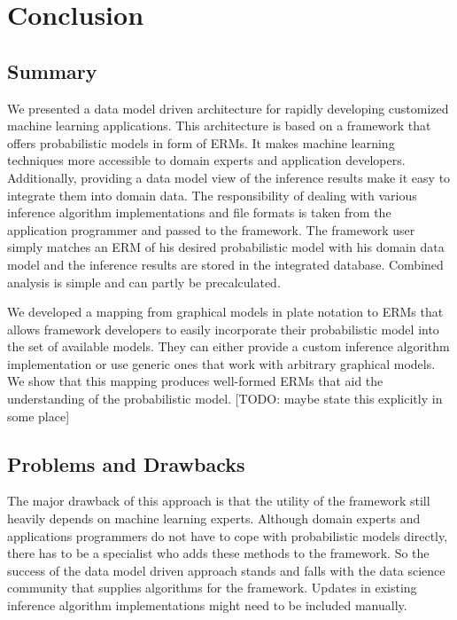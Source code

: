 \section{Conclusion}

\subsection{Summary}

We presented a data model driven architecture for rapidly developing customized machine learning applications. This architecture is based on a framework that offers probabilistic models in form of ERMs. It makes machine learning techniques more accessible to domain experts and application developers. Additionally, providing a data model view of the inference results make it easy to integrate them into domain data. The responsibility of dealing with various inference algorithm implementations and file formats is taken from the application programmer and passed to the framework. The framework user simply matches an ERM of his desired probabilistic model with his domain data model and the inference results are stored in the integrated database. Combined analysis is simple and can partly be precalculated.

We developed a mapping from graphical models in plate notation to ERMs that allows framework developers to easily incorporate their probabilistic model into the set of available models. They can either provide a custom inference algorithm implementation or use generic ones that work with arbitrary graphical models. We show that this mapping produces well-formed ERMs that aid the understanding of the probabilistic model. [TODO: maybe state this explicitly in some place]

\subsection{Problems and Drawbacks}

The major drawback of this approach is that the utility of the framework still heavily depends on machine learning experts. Although domain experts and applications programmers do not have to cope with probabilistic models directly, there has to be a specialist who adds these methods to the framework. So the success of the data model driven approach stands and falls with the data science community that supplies algorithms for the framework. Updates in existing inference algorithm implementations might need to be included manually.

